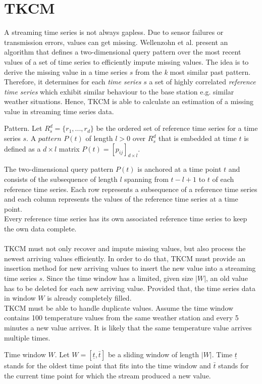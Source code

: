 \documentclass[abstracton,12pt]{scrreprt}
\begin{document}
\section{TKCM}
A streaming time series is not always gapless. Due to sensor failures or transmission errors, values can get missing. Wellenzohn et al.\cite{BScT} present an algorithm that defines a two-dimensional query pattern over the most recent values of a set of time series to efficiently impute missing values. The idea is to derive the missing value in a time series $s$ from the \emph{k} most similar past pattern. Therefore, it determines for each \emph{time series} $s$ a set of highly correlated \emph{reference time series} which exhibit similar behaviour to the base station e.g. similar weather situations. Hence, TKCM is able to calculate an estimation of a missing value in streaming time series data. 
\begin{defn}
	Pattern. Let $R_s^d=\{r_1,...,r_d\}$ be the ordered set of reference time series for a time series $s$. A $pattern$ $P(t)$ of length $l > 0$ over $R_s^d$ that is embedded at time $t$ is defined as a $d\times l$ matrix $P(t) = [p_{ij}]_{d\times l}$. 
\end{defn}
The two-dimensional query pattern $P(t)$ is anchored at a time point $t$ and consists of the subsequence of length $l$ spanning from $t-l+1$ to $t$ of each reference time series. Each row represents a subsequence of a reference time series and each column represents the values of the reference time series at a time point.\\Every reference time series has its own associated reference time series to keep the own data complete. \\ \\
TKCM must not only recover and impute missing values, but also process the newest arriving values efficiently. In order to do that, TKCM must provide an insertion method for new arriving values to insert the new value into a streaming time series $s$. Since the time window has a limited, given size $|W|$, an old value has to be deleted for each new arriving value. Provided that, the time series data in window $W$ is already completely filled. \\       
TKCM must be able to handle duplicate values. Assume the time window contains 100 temperature values from the same weather station and every 5 minutes a new value arrives. It is likely that the same temperature value arrives multiple times.
\begin{defn}
Time window $W$. Let $W=[ \underline{t}, \bar{t} ]$ be a sliding window of length $|W|$. Time $\underline{t}$ stands for the oldest time point that fits into the time window and $\bar{t}$ stands for the current time point for which the stream produced a new value. 
\end{defn}
\end{document}
